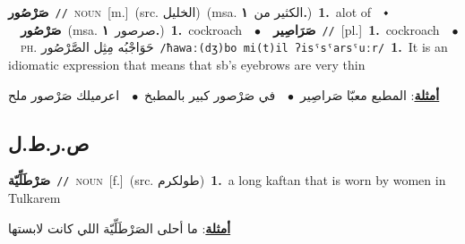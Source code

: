 \documentclass[10pt,a4paper,twoside]{article} %
\begin{document}
\begin{multicols}{2}
{\setlength\topsep{0pt}\textbf{\foreignlanguage{arabic}{صَرْصُور}}\ {\color{gray}\texttt{//}\color{black}}\ \textsc{noun}\ [m.]\ (src. \color{gray}\foreignlanguage{arabic}{الخليل}\color{black})\ \color{gray}(msa. \foreignlanguage{arabic}{الكثير من}~\foreignlanguage{arabic}{\textbf{١.}})\color{black}\ \textbf{1.}~alot of\ \ $\smblkdiamond$\ \ \setlength\topsep{0pt}\textbf{\foreignlanguage{arabic}{صَرْصُور}}\ \color{gray}(msa. \foreignlanguage{arabic}{صرصور}~\foreignlanguage{arabic}{\textbf{١.}})\color{black}\ \textbf{1.}~cockroach\ \ $\bullet$\ \ \setlength\topsep{0pt}\textbf{\foreignlanguage{arabic}{صَرَاصِير}}\ {\color{gray}\texttt{//}\color{black}}\ [pl.]\ \textbf{1.}~cockroach\ \ $\bullet$\ \ \textsc{ph.} \color{gray} \foreignlanguage{arabic}{حَوَاجْبُه مِثِل الصَّرْصُور}\color{black}\ {\color{gray}\texttt{/{\sffamily ħawaː(dʒ)bo mi(t)il ʔisˤsˤarsˤuːr}/}\color{black}}\ \textbf{1.}~It is an idiomatic expression that means that sb's eyebrows are very thin\  \begin{flushright}\color{gray}\foreignlanguage{arabic}{\textbf{\underline{\foreignlanguage{arabic}{أمثلة}}}: المطبع معبّا صَراصِير\ $\bullet$\ \  في صَرْصور كبير بالمطبخ\ $\bullet$\ \  اعرميلك صَرْصور ملح}\end{flushright}\color{black}} \vspace{2mm}

\vspace{-3mm}
\subsection*{\color{blue}\foreignlanguage{arabic}{ص.ر.ط.ل}\color{blue}{ (ntws)}} 

{\setlength\topsep{0pt}\textbf{\foreignlanguage{arabic}{صَرْطَلِّيّة}}\ {\color{gray}\texttt{//}\color{black}}\ \textsc{noun}\ [f.]\ (src. \color{gray}\foreignlanguage{arabic}{طولكرم}\color{black})\ \textbf{1.}~a long kaftan that is worn by women in Tulkarem\  \begin{flushright}\color{gray}\foreignlanguage{arabic}{\textbf{\underline{\foreignlanguage{arabic}{أمثلة}}}: ما أحلى الصَرْطَلِّيّة اللي كانت لابستها}\end{flushright}\color{black}} \vspace{2mm}


\end{multicols}
\end{document}
